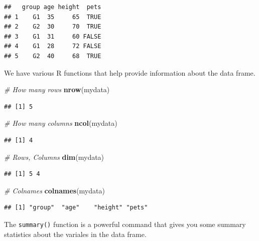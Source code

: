 \documentclass[
]{book}
\newenvironment{Shaded}{\begin{snugshade}}{\end{snugshade}}
\newcommand{\CommentTok}[1]{\textcolor[rgb]{0.56,0.35,0.01}{\textit{#1}}}
\newcommand{\KeywordTok}[1]{\textcolor[rgb]{0.13,0.29,0.53}{\textbf{#1}}}
\newcommand{\NormalTok}[1]{#1}
\begin{document}
\begin{verbatim}
##   group age height  pets
## 1    G1  35     65  TRUE
## 2    G2  30     70  TRUE
## 3    G1  31     60 FALSE
## 4    G1  28     72 FALSE
## 5    G2  40     68  TRUE
\end{verbatim}

We have various R functions that help provide information about the data frame.

\begin{Shaded}
\begin{Highlighting}[]
\CommentTok{# How many rows}
\KeywordTok{nrow}\NormalTok{(mydata)}
\end{Highlighting}
\end{Shaded}

\begin{verbatim}
## [1] 5
\end{verbatim}

\begin{Shaded}
\begin{Highlighting}[]
\CommentTok{# How many columns}
\KeywordTok{ncol}\NormalTok{(mydata)}
\end{Highlighting}
\end{Shaded}

\begin{verbatim}
## [1] 4
\end{verbatim}

\begin{Shaded}
\begin{Highlighting}[]
\CommentTok{# Rows, Columns}
\KeywordTok{dim}\NormalTok{(mydata)}
\end{Highlighting}
\end{Shaded}

\begin{verbatim}
## [1] 5 4
\end{verbatim}

\begin{Shaded}
\begin{Highlighting}[]
\CommentTok{# Colnames}
\KeywordTok{colnames}\NormalTok{(mydata)}
\end{Highlighting}
\end{Shaded}

\begin{verbatim}
## [1] "group"  "age"    "height" "pets"
\end{verbatim}

The \texttt{summary()} function is a powerful command that gives you some summary statistics about the variales in the data frame.
\end{document}
